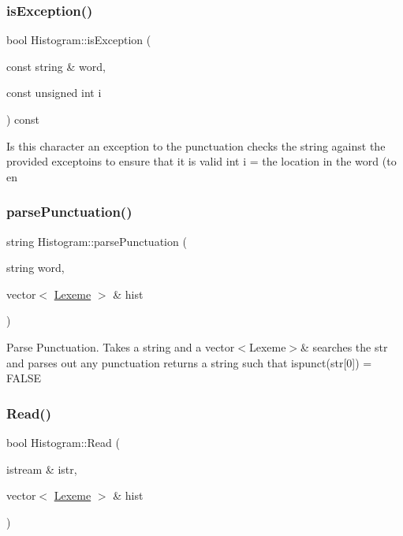 \subsubsection{\texorpdfstring{is\+Exception()}{isException()}}
{\footnotesize\ttfamily bool Histogram\+::is\+Exception (\begin{DoxyParamCaption}\item[{const string \&}]{word,  }\item[{const unsigned int}]{i }\end{DoxyParamCaption}) const}

Is this character an exception to the punctuation checks the string against the provided exceptoins to ensure that it is valid int i = the location in the word (to en \mbox{\label{classHistogram_aa1ae3a4f490aef85530afc028867b8f4}} 
\subsubsection{\texorpdfstring{parse\+Punctuation()}{parsePunctuation()}}
{\footnotesize\ttfamily string Histogram\+::parse\+Punctuation (\begin{DoxyParamCaption}\item[{string}]{word,  }\item[{vector$<$ \hyperlink{classLexeme}{Lexeme} $>$ \&}]{hist }\end{DoxyParamCaption})}

Parse Punctuation. Takes a string and a vector$<$\+Lexeme$>$\& searches the str and parses out any punctuation returns a string such that ispunct(str\mbox{[}0\mbox{]}) = F\+A\+L\+SE \mbox{\label{classHistogram_afbdf1d9a97070fd3724dbe55fd9f8570}} 
\subsubsection{\texorpdfstring{Read()}{Read()}}
{\footnotesize\ttfamily bool Histogram\+::\+Read (\begin{DoxyParamCaption}\item[{istream \&}]{istr,  }\item[{vector$<$ \hyperlink{classLexeme}{Lexeme} $>$ \&}]{hist }\end{DoxyParamCaption})}

